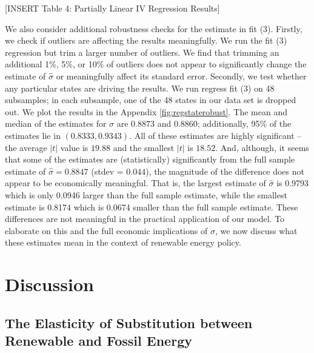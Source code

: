 \documentclass[11pt,a4paper,leqno]{extarticle}
\begin{document}
	
	\vspace{0.15in}
	\begin{center}
		[INSERT Table 4: Partially Linear IV Regression Results]
	\end{center}
	\vspace{0.15in}
	
	
	We also consider additional robustness checks for the estimate in fit (3). Firstly, we check if outliers are affecting the results meaningfully. We run the fit (3) regression but trim a larger number of outliers. We find that trimming an additional 1\%, 5\%, or 10\% of outliers does not appear to significantly change the estimate of $\hat{\sigma}$ or meaningfully affect its standard error. Secondly, we test whether any particular states are driving the results. We run regress fit (3) on 48 subsamples; in each subsample, one of the 48 states in our data set is dropped out. We plot the results in the Appendix \autoref{fig:regstaterobust}. The mean and median of the estimates for $\sigma$ are  $0.8873$ and $0.8860$; additionally, 95\% of the estimates lie in $(0.8333, 0.9343)$. All of these estimates are highly significant -- the average $|t|$ value is $19.88$ and the smallest $|t|$ is $18.52$. And, although, it seems that some of the estimates are (statistically) significantly  from the full sample estimate of $\hat{\sigma} = 0.8847$ (stdev = $0.044$), the magnitude of the difference does not appear to be economically meaningful. That is, the largest estimate of $\hat{\sigma}$ is 0.9793 which is only 0.0946 larger than the full sample estimate, while the smallest estimate is 0.8174 which is 0.0674 smaller than the full sample estimate. These differences are not meaningful in the practical application of our model. To elaborate on this and the full economic implications of $\sigma$, we now discuss what these estimates mean in the context of renewable energy policy.
	
	
	
	
	\clearpage
	\section{Discussion}
	\label{sec:Discussion}
	
	\subsection{The Elasticity of Substitution between Renewable and Fossil Energy}
	
\end{document}
